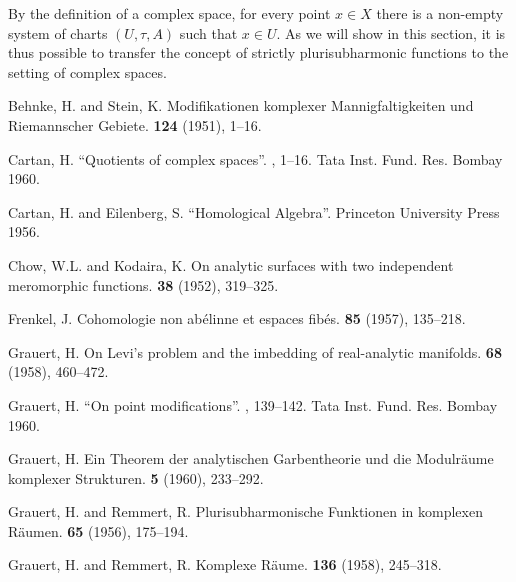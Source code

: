 \documentclass{article}
\theoremstyle{plain}
\begin{document}
By the definition of a complex space, for every point $x\in X$ there is a non-empty system of charts $(U,\tau,A)$ such that $x\in U$.
As we will show in this section, it is thus possible to transfer the concept of strictly plurisubharmonic functions to the setting of complex spaces.



\nocite{*}

\begin{thebibliography}{20}

  {\sc Behnke, H. and Stein, K.}
  \newblock Modifikationen komplexer Mannigfaltigkeiten und Riemannscher Gebiete.
   {\bf 124} (1951), 1--16.

  {\sc Cartan, H.}
  \newblock ``Quotients of complex spaces''.
  , 1--16.
  \newblock Tata Inst. Fund. Res. Bombay 1960.

  {\sc Cartan, H. and Eilenberg, S.}
  \newblock ``Homological Algebra''.
  \newblock Princeton University Press 1956.

  {\sc Chow, W.L. and Kodaira, K.}
  \newblock On analytic surfaces with two independent meromorphic functions.
   {\bf 38} (1952), 319--325.

  {\sc Frenkel, J.}
  \newblock Cohomologie non ab\'{e}linne et espaces fib\'{e}s.
   {\bf 85} (1957), 135--218.

  {\sc Grauert, H.}
  \newblock On Levi's problem and the imbedding of real-analytic manifolds.
   {\bf 68} (1958), 460--472.

  {\sc Grauert, H.}
  \newblock ``On point modifications''.
  , 139--142.
  \newblock Tata Inst. Fund. Res. Bombay 1960.

  {\sc Grauert, H.}
  \newblock Ein Theorem der analytischen Garbentheorie und die Modulr\"{a}ume komplexer Strukturen.
   {\bf 5} (1960), 233--292.

  {\sc Grauert, H. and Remmert, R.}
  \newblock Plurisubharmonische Funktionen in komplexen R\"{a}umen.
   {\bf 65} (1956), 175--194.

  {\sc Grauert, H. and Remmert, R.}
  \newblock Komplexe R\"{a}ume.
   {\bf 136} (1958), 245--318.


\end{thebibliography}
\end{document}
